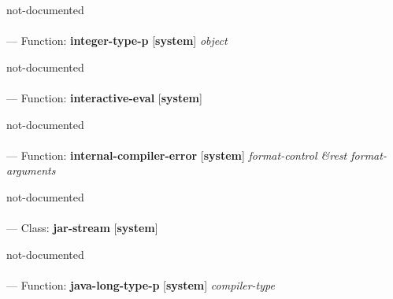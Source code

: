 \begin{adjustwidth}{5em}{5em}
not-documented
\end{adjustwidth}

\paragraph{}
\label{SYSTEM:INTEGER-TYPE-P}
--- Function: \textbf{integer-type-p} [\textbf{system}] \textit{object}

\begin{adjustwidth}{5em}{5em}
not-documented
\end{adjustwidth}

\paragraph{}
\label{SYSTEM:INTERACTIVE-EVAL}
--- Function: \textbf{interactive-eval} [\textbf{system}] \textit{}

\begin{adjustwidth}{5em}{5em}
not-documented
\end{adjustwidth}

\paragraph{}
\label{SYSTEM:INTERNAL-COMPILER-ERROR}
--- Function: \textbf{internal-compiler-error} [\textbf{system}] \textit{format-control \&rest format-arguments}

\begin{adjustwidth}{5em}{5em}
not-documented
\end{adjustwidth}

\paragraph{}
\label{SYSTEM:JAR-STREAM}
--- Class: \textbf{jar-stream} [\textbf{system}] \textit{}

\begin{adjustwidth}{5em}{5em}
not-documented
\end{adjustwidth}

\paragraph{}
\label{SYSTEM:JAVA-LONG-TYPE-P}
--- Function: \textbf{java-long-type-p} [\textbf{system}] \textit{compiler-type}

